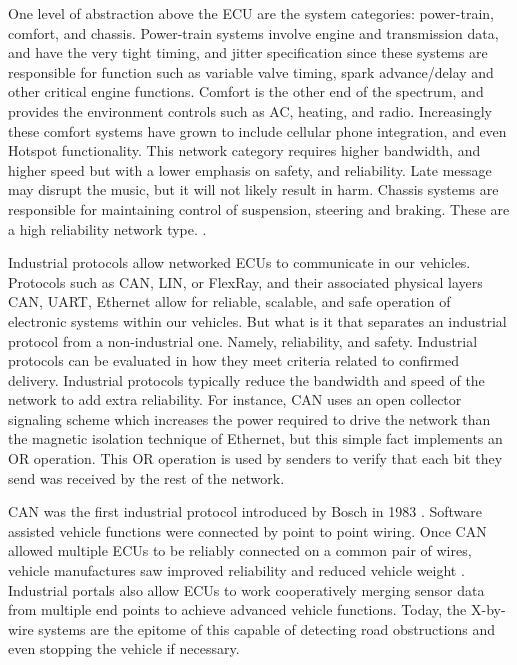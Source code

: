 \documentclass[conference,12pt]{IEEEtran}
\begin{document}
One level of abstraction above the ECU are the system categories: power-train,
comfort, and chassis.  Power-train systems involve engine and transmission
data, and have the very tight timing, and jitter specification since these
systems are responsible for function such as variable valve timing, spark
advance/delay and other critical engine functions. Comfort is the other end of
the spectrum, and provides the environment controls such as AC, heating, and
radio.  Increasingly these comfort systems have grown to include cellular phone
integration, and even Hotspot functionality. This network category requires
higher bandwidth, and higher speed but with a lower emphasis on safety, and
reliability. Late message may disrupt the music, but it will not likely result
in harm.  Chassis systems are responsible for maintaining control of suspension,
steering and braking. These are a high reliability network type.
\autocite{navet_trends_2005}.


Industrial protocols allow networked ECUs to
communicate in our vehicles. Protocols such as CAN, LIN, or
FlexRay,
and their associated physical layers CAN, UART, Ethernet allow for reliable,
scalable, and safe operation of electronic systems within our vehicles.  But
what is it that separates an industrial protocol from a non-industrial one.
Namely, reliability, and safety.  Industrial protocols can be evaluated in how
they meet criteria related to confirmed delivery.  Industrial protocols
typically reduce the bandwidth and speed of the network to add extra
reliability. For instance, CAN uses an open collector signaling scheme which
increases the power required to drive the network than the magnetic isolation
technique of Ethernet, but this simple fact implements an OR operation. This OR
operation is used by senders to verify that each bit they send was received by
the rest of the network.  

CAN was the first industrial protocol introduced by
Bosch in 1983 \autocite{std_can}. Software assisted vehicle functions were connected by point to
point wiring.  Once CAN allowed multiple ECUs to be reliably connected on
a common pair of wires, vehicle manufactures saw improved reliability and
reduced vehicle weight \autocite{navet_trends_2005}.  Industrial portals also allow ECUs to
work cooperatively merging sensor data from multiple end points to achieve
advanced vehicle functions. Today, the X-by-wire systems are the epitome of this
capable of detecting road obstructions and even stopping the vehicle if
necessary.  
\end{document}
